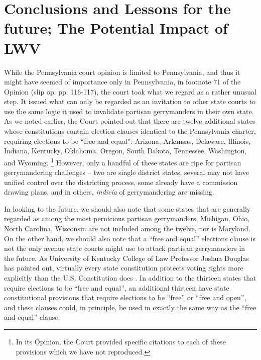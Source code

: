     \section{Conclusions and Lessons for the future; The Potential Impact of LWV}
    While the Pennsylvania court opinion is limited to Pennsylvania, and thus it might have seemed of importance only in Pennsylvania, in footnote 71 of the Opinion (slip op. pp. 116-117), the court took what we regard as a rather unusual step. It issued what can only be regarded as an invitation to other state courts to use the same logic it used to invalidate partisan gerrymanders in their own state. As we noted earlier, the Court pointed out that there are twelve additional states whose constitutions contain election clauses identical to the Pennsylvania charter, requiring elections to be ``free and equal'': Arizona, Arkansas, Delaware, Illinois, Indiana, Kentucky, Oklahoma, Oregon, South Dakota, Tennessee, Washington, and Wyoming.
        \footnote{In its Opinion, the Court provided specific citations to each of these provisions which we have not reproduced.}
    However, only a handful of these states are ripe for partisan gerrymandering challenges -- two are single district states, several may not have unified control over the districting process, some already have a commission drawing plans, and in others, \textit{indicia} of gerrymandering are missing.
\par
    In looking to the future, we should also note that some states that are generally regarded as among the most pernicious partisan gerrymanders, Michigan, Ohio, North Carolina, Wisconsin are not included among the twelve, nor is Maryland. On the other hand, we should also note that a ``free and equal'' elections clause is not the only avenue state courts might use to attack partisan gerrymanders in the future. As University of Kentucky College of Law Professor Joshua Douglas has pointed out, virtually every state constitution protects voting rights more explicitly than the U.S. Constitution does \citep{Douglas2014_RightToVote}. In addition to the thirteen states that require elections to be ``free and equal'', an additional thirteen have state constitutional provisions that require elections to be ``free'' or ``free and open'', and these clauses could, in principle, be used in exactly the same way as the ``free and equal'' clause. 
